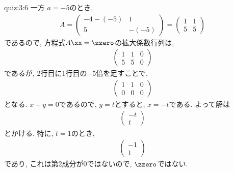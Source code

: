 \begin{answerof}{quiz:3:6}
  一方
  $a=-5$のとき,
  \begin{align*}
    A=\begin{pmatrix}-4-(-5)&1\\5&-(-5)\end{pmatrix}
    =\begin{pmatrix}1&1\\5&5\end{pmatrix}
  \end{align*}
  であるので, 方程式$A\xx=\zzero$の拡大係数行列は,
  \begin{align*}
    \begin{pmatrix}1&1&0\\5&5&0\end{pmatrix}
  \end{align*}
  であるが, 2行目に1行目の$-5$倍を足すことで,
  \begin{align*}
    \begin{pmatrix}1&1&0\\0&0&0\end{pmatrix}
  \end{align*}
  となる.
  $x+y=0$であるので, $y=t$とすると, $x=-t$である.
  よって解は
  \begin{align*}
    \begin{pmatrix}-t\\t\end{pmatrix}
  \end{align*}
  とかける. 特に, $t=1$のとき,
  \begin{align*}
    \begin{pmatrix}-1\\1\end{pmatrix}
  \end{align*}
  であり, これは第2成分が$0$ではないので, $\zzero$ではない.  
\end{answerof}





